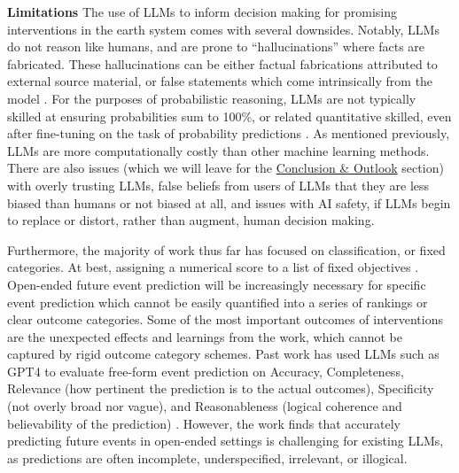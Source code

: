 \documentclass[12pt,a4paper]{article}
\begin{document}
\textbf{Limitations}
\label{sub:limitations}
The use of LLMs to inform decision making for promising interventions in the earth system comes with several downsides. Notably, LLMs do not reason like humans, and are prone to ``hallucinations''  where facts are fabricated. These hallucinations can be either factual fabrications attributed to external source material, or false statements which come intrinsically from the model . For the purposes of probabilistic reasoning, LLMs are not typically skilled at ensuring probabilities sum to 100\%, or related quantitative skilled, even after fine-tuning on the task of probability predictions . As mentioned previously, LLMs are more computationally costly than other machine learning methods. There are also issues (which we will leave for the \hyperref[sec:conclusion_outlook]{Conclusion \& Outlook} section) with overly trusting LLMs, false beliefs from users of LLMs that they are less biased than humans or not biased at all, and issues with AI safety, if LLMs begin to replace or distort, rather than augment, human decision making.

Furthermore, the majority of work thus far has focused on classification, or fixed categories. At best, assigning a numerical score to a list of fixed objectives  . Open-ended future event prediction will be increasingly necessary for specific event prediction which cannot be easily quantified into a series of rankings or clear outcome categories. Some of the most important outcomes of interventions are the unexpected effects and learnings from the work, which cannot be captured by rigid outcome category schemes. Past work has used LLMs such as GPT4 to evaluate free-form event prediction on Accuracy, Completeness, Relevance (how pertinent the prediction is to the actual outcomes), Specificity (not overly broad nor vague), and Reasonableness (logical coherence and believability of the prediction) . However, the work finds that accurately predicting future events in open-ended settings is challenging for existing LLMs, as predictions are often incomplete, underspecified, irrelevant, or illogical.
\end{document}
